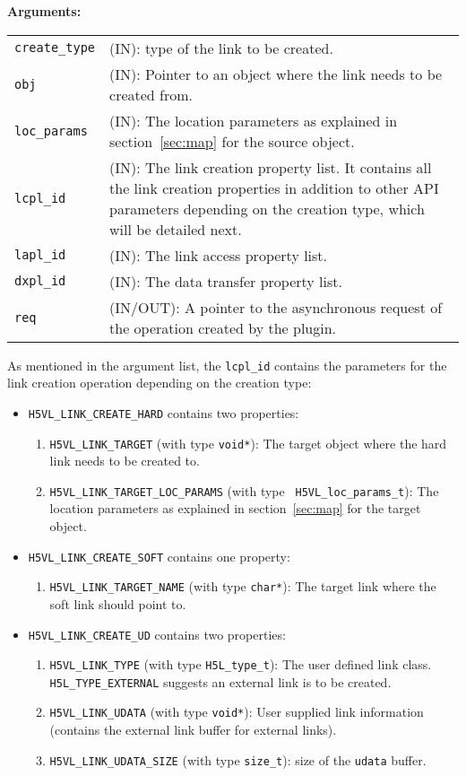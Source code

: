 \textbf{Arguments:}\\
\begin{tabular}{l p{10cm}}
  {\tt create\_type} & (IN): type of the link to be created.\\
  {\tt obj} & (IN): Pointer to an object where the link needs to be
  created from.\\
  {\tt loc\_params} & (IN): The location parameters as explained in
  section~\ref{sec:map} for the source object. \\
  {\tt lcpl\_id} & (IN): The link creation property list. It contains
  all the link creation properties in addition to other API parameters
  depending on the creation type, which will be detailed next.\\
  {\tt lapl\_id} & (IN): The link access property list.\\
  {\tt dxpl\_id} & (IN): The data transfer property list.\\
  {\tt req} & (IN/OUT): A pointer to the asynchronous request of the
  operation created by the plugin.\\
\end{tabular}

As mentioned in the argument list, the {\tt lcpl\_id} contains the
parameters for the link creation operation depending on the creation
type:
\begin{itemize}
\item {\tt H5VL\_LINK\_CREATE\_HARD} contains two properties:
  \begin{enumerate}
  \item {\tt H5VL\_LINK\_TARGET} (with type {\tt void*}): The target
    object where the hard link needs to be created to.
  \item {\tt H5VL\_LINK\_TARGET\_LOC\_PARAMS} (with type {\tt
      H5VL\_loc\_params\_t}): The location parameters as explained in
    section~\ref{sec:map} for the target object.
  \end{enumerate}

\item {\tt H5VL\_LINK\_CREATE\_SOFT} contains one property:
  \begin{enumerate}
  \item {\tt H5VL\_LINK\_TARGET\_NAME} (with type {\tt char*}): The target
    link where the soft link should point to.
  \end{enumerate}

\item {\tt H5VL\_LINK\_CREATE\_UD} contains two properties:
  \begin{enumerate}
  \item {\tt H5VL\_LINK\_TYPE} (with type {\tt H5L\_type\_t}): The
    user defined link class. {\tt H5L\_TYPE\_EXTERNAL} suggests an
    external link is to be created.
  \item {\tt H5VL\_LINK\_UDATA} (with type {\tt void*}): User supplied
    link information (contains the external link buffer for external
    links). 
  \item {\tt H5VL\_LINK\_UDATA\_SIZE} (with type {\tt size\_t}): size
    of the {\tt udata} buffer. 
  \end{enumerate}
\end{itemize}

